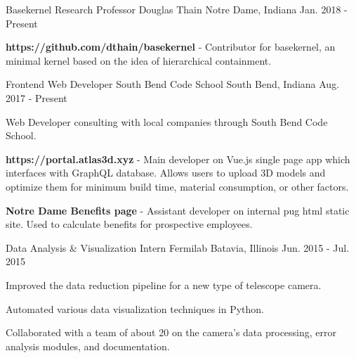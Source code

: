 \begin{cventries}
  \cventry
    {Basekernel Research}
    {Professor Douglas Thain}
    {Notre Dame, Indiana}
    {Jan. 2018 - Present}
    {
      \begin{cvitems}
        \item {{\bf https://github.com/dthain/basekernel} - Contributor for basekernel, an minimal kernel based on the idea of hierarchical containment.}
      \end{cvitems}
    }
  \cventry
    {Frontend Web Developer}
    {South Bend Code School}
    {South Bend, Indiana}
    {Aug. 2017 - Present}
    {
      \begin{cvitems}
        \item {Web Developer consulting with local companies through South Bend Code School.}
        \item {{\bf https://portal.atlas3d.xyz} - Main developer on Vue.js single page app which interfaces with GraphQL database.  Allows users to upload 3D models and optimize them for minimum build time, material consumption, or other factors.}
        \item {{\bf Notre Dame Benefits page} - Assistant developer on internal pug html static site.  Used to calculate benefits for prospective employees.}
      \end{cvitems}
    }
\iffalse
  \cventry
    {Donation Facilitator}
    {Notre Dame Alumni Center}
    {Notre Dame, Indiana}
    {Sep. 2016 - May. 2017}
    {
      \begin{cvitems}
        \item {Facilitated financial contributions to the University for various causes and campaigns.}
        \item {Exceeded the average amount of donations by more than 17\% in every report.}
      \end{cvitems}
    }
\fi
  \cventry
    {Data Analysis \& Visualization Intern}
    {Fermilab}
    {Batavia, Illinois}
    {Jun. 2015 - Jul. 2015}
    {
      \begin{cvitems}
        \item {Improved the data reduction pipeline for a new type
of telescope camera.}
        \item {Automated various data visualization techniques in Python.}
        \item {Collaborated with a team of about 20 on the camera’s data processing, error analysis modules, and documentation.}
      \end{cvitems}
    }
\end{cventries}
